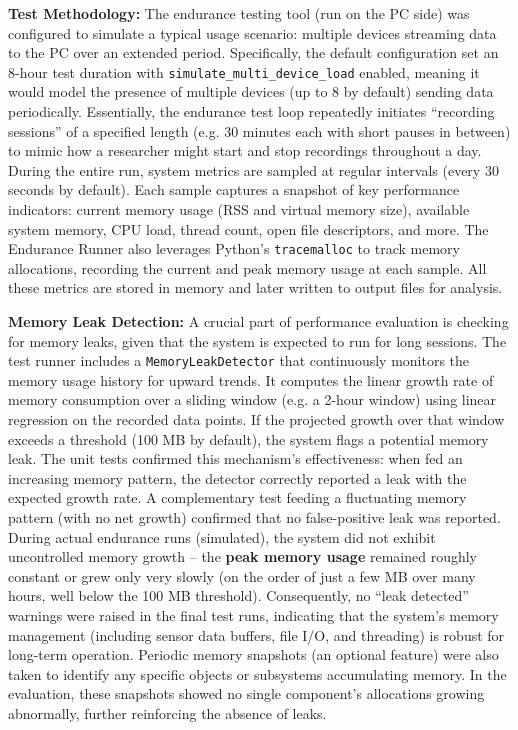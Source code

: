 \textbf{Test Methodology:} The endurance testing tool (run on the PC side) was configured to simulate a typical usage scenario: multiple devices streaming data to the PC over an extended period. Specifically, the default configuration set an 8-hour test duration with \texttt{simulate\_multi\_device\_load} enabled, meaning it would model the presence of multiple devices (up to 8 by default) sending data periodically. Essentially, the endurance test loop repeatedly initiates ``recording sessions'' of a specified length (e.g. 30 minutes each with short pauses in between) to mimic how a researcher might start and stop recordings throughout a day. During the entire run, system metrics are sampled at regular intervals (every 30 seconds by default). Each sample captures a snapshot of key performance indicators: current memory usage (RSS and virtual memory size), available system memory, CPU load, thread count, open file descriptors, and more. The Endurance Runner also leverages Python's \texttt{tracemalloc} to track memory allocations, recording the current and peak memory usage at each sample. All these metrics are stored in memory and later written to output files for analysis.

\textbf{Memory Leak Detection:} A crucial part of performance evaluation is checking for memory leaks, given that the system is expected to run for long sessions. The test runner includes a \texttt{MemoryLeakDetector} that continuously monitors the memory usage history for upward trends. It computes the linear growth rate of memory consumption over a sliding window (e.g. a 2-hour window) using linear regression on the recorded data points. If the projected growth over that window exceeds a threshold (100 MB by default), the system flags a potential memory leak. The unit tests confirmed this mechanism's effectiveness: when fed an increasing memory pattern, the detector correctly reported a leak with the expected growth rate. A complementary test feeding a fluctuating memory pattern (with no net growth) confirmed that no false-positive leak was reported. During actual endurance runs (simulated), the system did not exhibit uncontrolled memory growth -- the \textbf{peak memory usage} remained roughly constant or grew only very slowly (on the order of just a few MB over many hours, well below the 100 MB threshold). Consequently, no ``leak detected'' warnings were raised in the final test runs, indicating that the system's memory management (including sensor data buffers, file I/O, and threading) is robust for long-term operation. Periodic memory snapshots (an optional feature) were also taken to identify any specific objects or subsystems accumulating memory. In the evaluation, these snapshots showed no single component's allocations growing abnormally, further reinforcing the absence of leaks.

